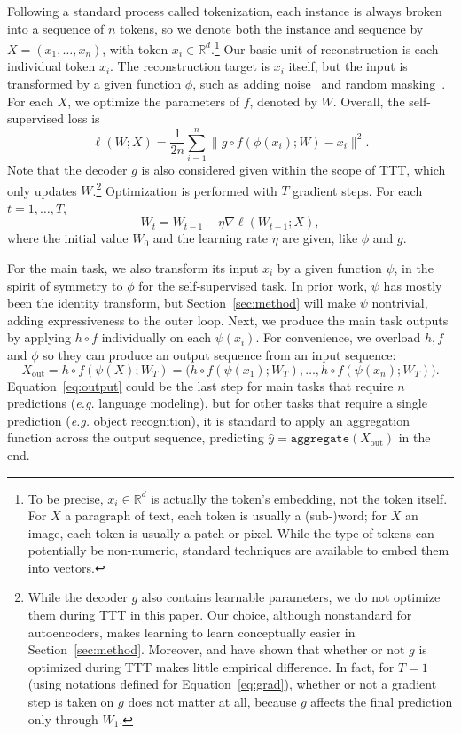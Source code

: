 \documentclass{article}
\newcommand{\R}{\mathbb{R}}
\begin{document}
Following a standard process called tokenization, each instance is always broken into a sequence of $n$ tokens, so we denote both the instance and sequence by $X = (x_1, \dots, x_n)$, with token $x_i\in\R^d$.\footnote{
To be precise, $x_i\in\R^d$ is actually the token's embedding, not the token itself. 
For $X$ a paragraph of text, each token is usually a (sub-)word; for $X$ an image, each token is usually a patch or pixel.
While the type of tokens can potentially be non-numeric, standard techniques are available to embed them into vectors.
}
Our basic unit of reconstruction is each individual token $x_i$.
The reconstruction target is $x_i$ itself, but the input is transformed by a given function $\phi$, such as adding noise~\citep{denoisingautoencoder} and random masking~\citep{mae}.
For each $X$, we optimize the parameters of $f$, denoted by $W$.
Overall, the self-supervised loss is
\begin{equation}
\label{eq:smalll}
\ell(W; X) 
= \frac{1}{2n} \sum_{i=1}^n \big\| g \circ f\left(\phi(x_i); W\right) -  x_i \big\|^2.
\end{equation}
Note that the decoder $g$ is also considered given within the scope of TTT, which only updates $W$.\footnote{
While the decoder $g$ also contains learnable parameters, we do not optimize them during TTT in this paper.
Our choice, although nonstandard for autoencoders, makes learning to learn conceptually easier in Section~\ref{sec:method}. 
Moreover, \cite{sun2020test} and \cite{ttt-mae} have shown that whether or not $g$ is optimized during TTT makes little empirical difference.
In fact, for $T=1$ (using notations defined for Equation~\ref{eq:grad}), whether or not a gradient step is taken on $g$ does not matter at all, because $g$ affects the final prediction only through $W_1$.
}
Optimization is performed with $T$ gradient steps.
For each $t = 1,\dots, T$,
\begin{equation}
\label{eq:grad}
W_t = W_{t-1} - \eta \nabla \ell(W_{t-1} ; X),
\end{equation}
where the initial value $W_0$ and the learning rate $\eta$ are given, like $\phi$ and $g$.

For the main task, we also transform its input $x_i$ by a given function $\psi$, in the spirit of symmetry to $\phi$ for the self-supervised task.
In prior work, $\psi$ has mostly been the identity transform, but Section~\ref{sec:method} will make $\psi$ nontrivial, adding expressiveness to the outer loop.
Next, we produce the main task outputs by applying $h\circ f$ individually on each $\psi(x_i)$.
For convenience, we overload $h, f$ and $\phi$ so they can produce an output sequence from an input sequence:
\begin{equation}
\label{eq:output}
X_\text{out} = h\circ f\left(\psi(X); W_T\right) 
= \bigg( h\circ f\left(\psi(x_1); W_T\right), \dots, h\circ f\left(\psi(x_n); W_T\right) \bigg).
\end{equation}
Equation~\ref{eq:output} could be the last step for main tasks that require $n$ predictions (\textit{e.g.} language modeling), but for other tasks that require a single prediction (\textit{e.g.} object recognition), 
it is standard to apply an aggregation function across the output sequence, predicting $\hat y = \texttt{aggregate}(X_\text{out})$ in the end.
\end{document}
